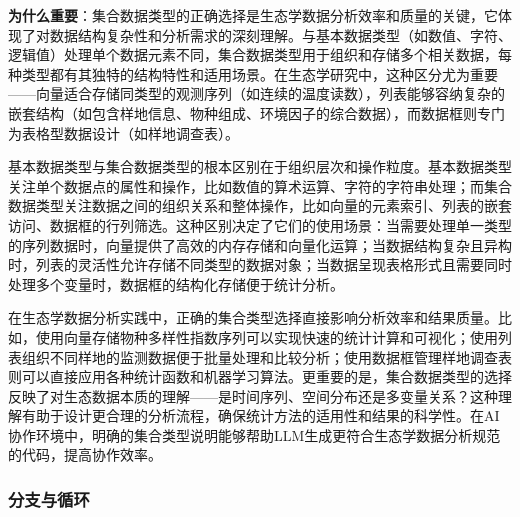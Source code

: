 \documentclass[
]{book}
\begin{document}
\textbf{为什么重要}：集合数据类型的正确选择是生态学数据分析效率和质量的关键，它体现了对数据结构复杂性和分析需求的深刻理解。与基本数据类型（如数值、字符、逻辑值）处理单个数据元素不同，集合数据类型用于组织和存储多个相关数据，每种类型都有其独特的结构特性和适用场景。在生态学研究中，这种区分尤为重要------向量适合存储同类型的观测序列（如连续的温度读数），列表能够容纳复杂的嵌套结构（如包含样地信息、物种组成、环境因子的综合数据），而数据框则专门为表格型数据设计（如样地调查表）。

基本数据类型与集合数据类型的根本区别在于组织层次和操作粒度。基本数据类型关注单个数据点的属性和操作，比如数值的算术运算、字符的字符串处理；而集合数据类型关注数据之间的组织关系和整体操作，比如向量的元素索引、列表的嵌套访问、数据框的行列筛选。这种区别决定了它们的使用场景：当需要处理单一类型的序列数据时，向量提供了高效的内存存储和向量化运算；当数据结构复杂且异构时，列表的灵活性允许存储不同类型的数据对象；当数据呈现表格形式且需要同时处理多个变量时，数据框的结构化存储便于统计分析。

在生态学数据分析实践中，正确的集合类型选择直接影响分析效率和结果质量。比如，使用向量存储物种多样性指数序列可以实现快速的统计计算和可视化；使用列表组织不同样地的监测数据便于批量处理和比较分析；使用数据框管理样地调查表则可以直接应用各种统计函数和机器学习算法。更重要的是，集合数据类型的选择反映了对生态数据本质的理解------是时间序列、空间分布还是多变量关系？这种理解有助于设计更合理的分析流程，确保统计方法的适用性和结果的科学性。在AI协作环境中，明确的集合类型说明能够帮助LLM生成更符合生态学数据分析规范的代码，提高协作效率。

\hypertarget{ux5206ux652fux4e0eux5faaux73af}{%
\subsubsection{分支与循环}\label{ux5206ux652fux4e0eux5faaux73af}}
\end{document}

